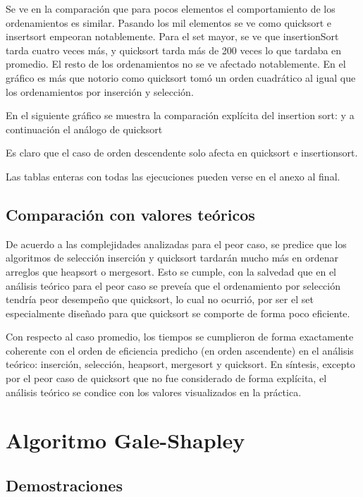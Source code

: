 \documentclass[article,a4paper]{article}
\begin{document}
Se ve en la comparación que para pocos elementos el comportamiento de los ordenamientos es similar. Pasando los mil elementos se ve como quicksort e insertsort empeoran notablemente. Para el set mayor, se ve que insertionSort tarda cuatro veces más, y quicksort tarda más de 200 veces lo que tardaba en promedio. El resto de los ordenamientos no se ve afectado notablemente.
En el gráfico es más que notorio como quicksort tomó un orden cuadrático al igual que los ordenamientos por inserción y selección.

En el siguiente gráfico se muestra la comparación explícita del insertion sort:
y a continuación el análogo de quicksort


Es claro que el caso de orden descendente solo afecta en quicksort e insertionsort.

Las tablas enteras con todas las ejecuciones pueden verse en el anexo al final.

\subsection{Comparación con valores teóricos}

De acuerdo a las complejidades analizadas para el peor caso, se predice que los algoritmos de selección inserción y quicksort tardarán mucho más en ordenar arreglos que heapsort o mergesort. Esto se cumple, con la salvedad que en el análisis teórico para el peor caso se preveía que el ordenamiento por selección tendría peor desempeño que quicksort, lo cual no ocurrió, por ser el set especialmente diseñado para que quicksort se comporte de forma poco eficiente.

Con respecto al caso promedio, los tiempos se cumplieron de forma exactamente coherente con el orden de eficiencia predicho (en orden ascendente) en el análisis teórico: inserción, selección, heapsort, mergesort y quicksort. En síntesis, excepto por el peor caso de quicksort que no fue considerado de forma explícita, el análisis teórico se condice con los valores visualizados en la práctica.

\section{Algoritmo Gale-Shapley}

\subsection{Demostraciones}
\end{document}
